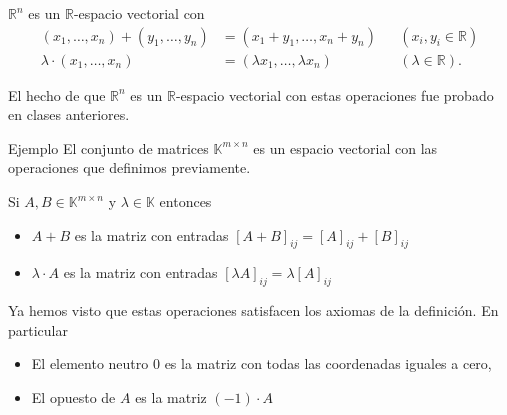 \documentclass[handout]{beamer} %
\newcommand{\R}{\mathbb R}
\newcommand{\K}{\mathbb K}
\begin{document}
            
        \begin{frame}
            \begin{ejemplo}
                $\R^n$  es un $\R$-espacio vectorial con 
                \begin{align*}
                    (x_1,\ldots,x_n) + (y_1,\ldots,y_n) &= (x_1+y_1,\ldots,x_n+y_n)&&(x_i,y_i \in \R) \\
                    \lambda \cdot (x_1,\ldots,x_n) &= (\lambda x_1,\ldots,\lambda x_n)&&(\lambda \in \R).
                \end{align*}

                El  hecho  de que $\R^n$  es un $\R$-espacio vectorial con estas operaciones  fue probado en clases anteriores. 
                
                \vskip 3cm
            \end{ejemplo}
        \end{frame}   
        \begin{frame}
        
        \begin{block}{Ejemplo}\pause
        El conjunto de matrices $\K^{m\times n}$ es un espacio vectorial con las operaciones que definimos previamente.
        \end{block}
        \pause
        \begin{block}{}
        Si $A,B\in\K^{m\times n}$ y $\lambda\in\K$ entonces
        \begin{itemize}
         \item $A+B$ es la matriz con entradas $[A+B]_{ij}=[A]_{ij}+[B]_{ij}$
         \item $\lambda\cdot A$ es la matriz con entradas $[\lambda A]_{ij}=\lambda[A]_{ij}$
        \end{itemize} 
        \end{block}
        \pause
        Ya hemos visto que estas operaciones satisfacen los axiomas de la definición. En particular
        \pause
        \begin{block}{}
        \begin{itemize}
         \item El elemento neutro $0$ es la matriz con todas las coordenadas iguales a cero,\pause
         \item El opuesto de $A$ es la matriz $(-1)\cdot A$
        \end{itemize} 
        \end{block}
        \end{frame}
 
\end{document}
